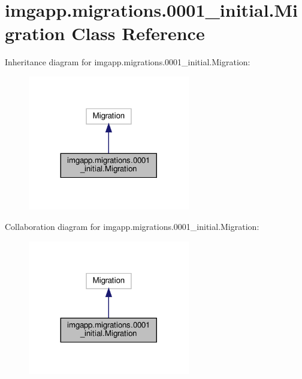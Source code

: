 \hypertarget{classimgapp_1_1migrations_1_10001__initial_1_1Migration}{}\section{imgapp.\+migrations.0001\+\_\+initial.Migration Class Reference}
\label{classimgapp_1_1migrations_1_10001__initial_1_1Migration}


Inheritance diagram for imgapp.\+migrations.0001\+\_\+initial.Migration\+:\nopagebreak
\begin{figure}[H]
\begin{center}
\leavevmode
\includegraphics[width=200pt]{classimgapp_1_1migrations_1_10001__initial_1_1Migration__inherit__graph}
\end{center}
\end{figure}


Collaboration diagram for imgapp.\+migrations.0001\+\_\+initial.Migration\+:\nopagebreak
\begin{figure}[H]
\begin{center}
\leavevmode
\includegraphics[width=200pt]{classimgapp_1_1migrations_1_10001__initial_1_1Migration__coll__graph}
\end{center}
\end{figure}
